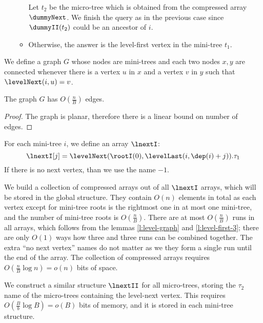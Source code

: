 \begin{enumerate}
\begin{itemize}
		Let $t_2$ be the micro-tree which is obtained from the compressed array $\dummyNext$.
		We finish the query as in the previous case since $\dummyII(t_2)$ could be an ancestor of $i$.
		
		\item Otherwise, the answer is the level-first vertex in the mini-tree $t_1$.
	\end{itemize}
\end{enumerate}

We define a graph $G$ whose nodes are mini-trees and each two nodes $x, y$ are connected whenever there is a vertex $u$ in $x$ and a vertex $v$ in $y$ such that $\levelNext(i, u) = v$.

\begin{lemma}\label{l:level-graph}
	The graph $G$ has $O\left(\frac{n}{B}\right)$ edges.
\end{lemma}
\begin{proof}
	The graph is planar, therefore there is a linear bound on number of edges.
\end{proof}

For each mini-tree $i$, we define an array $\lnextI$:
$$ \lnextI[j] = \levelNext(\rootI(0), \levelLast(i, \dep(i) + j)).\tau_1$$
If there is no next vertex, than we use the name $-1$.

We build a collection of compressed arrays out of all $\lnextI$ arrays, which will be stored in the global structure.
They contain $O(n)$ elements in total as each vertex except for mini-tree roots is the rightmost one in at most one mini-tree, and the number of mini-tree roots is $O\left(\frac{n}{B}\right)$.
There are at most $O\left(\frac{n}{B}\right)$ runs in all arrays, which follows from the lemmas \ref{l:level-graph} and \ref{l:level-first-3}; there are only $O(1)$ ways how three and three runs can be combined together.
The extra ``no next vertex'' names do not matter as we they form a single run until the end of the array.
The collection of compressed arrays requires $O\left(\frac{n}{B} \log n\right) = o(n)$ bits of space.

We construct a similar structure $\lnextII$ for all micro-trees, storing the $\tau_2$ name of the micro-trees containing the level-next vertex.
This requires $O\left(\frac{B}{b} \log B\right) = o(B)$ bits of memory, and it is stored in each mini-tree structure.

